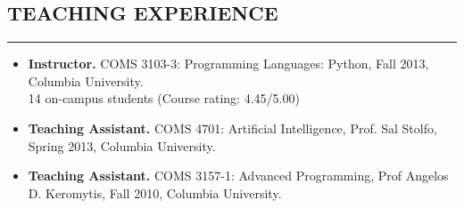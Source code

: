 \documentclass[10pt,a4]{article}
\begin{document}
\begin{small}
%

\subsection*{TEACHING EXPERIENCE}
\hrule
\vspace{0.2cm}

\begin{itemize}

\item {\bf Instructor.} COMS 3103-3: Programming Languages: Python, Fall 2013,
  Columbia University.\\
  14 on-campus students (Course rating: 4.45/5.00)

\item {\bf Teaching Assistant.} COMS 4701: Artificial Intelligence, Prof. Sal
  Stolfo, Spring 2013, Columbia University.

\item {\bf Teaching Assistant.} COMS 3157-1: Advanced Programming, Prof Angelos
  D. Keromytis, Fall 2010, Columbia University.
\end{itemize}



\end{small}
\end{document}
